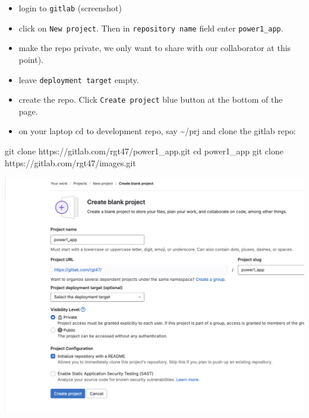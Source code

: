 \documentclass[
  letterpaper,
  DIV=11,
  numbers=noendperiod,
  oneside]{scrartcl}
\newenvironment{Shaded}{\begin{snugshade}}{\end{snugshade}}
\newcommand{\BuiltInTok}[1]{\textcolor[rgb]{0.00,0.23,0.31}{#1}}
\newcommand{\FunctionTok}[1]{\textcolor[rgb]{0.28,0.35,0.67}{#1}}
\newcommand{\NormalTok}[1]{\textcolor[rgb]{0.00,0.23,0.31}{#1}}
\begin{document}
\begin{tcolorbox}[enhanced jigsaw, title=\textcolor{quarto-callout-note-color}{\faInfo}\hspace{0.5em}{Details for creating a gitlab repo follow:}, colback=white, arc=.35mm, leftrule=.75mm, titlerule=0mm, bottomtitle=1mm, opacityback=0, opacitybacktitle=0.6, breakable, left=2mm, toptitle=1mm, bottomrule=.15mm, rightrule=.15mm, toprule=.15mm, colbacktitle=quarto-callout-note-color!10!white, coltitle=black, colframe=quarto-callout-note-color-frame]

\begin{itemize}
\item
  login to \texttt{gitlab} (screenshot)
\item
  click on \texttt{New\ project}. Then in \texttt{repository\ name}
  field enter \texttt{power1\_app}.
\item
  make the repo private, we only want to share with our collaborator at
  this point).
\item
  leave \texttt{deployment\ target} empty.
\item
  create the repo. Click \texttt{Create\ project} blue button at the
  bottom of the page.
\item
  on your laptop cd to development repo, say \textasciitilde/prj and
  clone the gitlab repo:
\end{itemize}

\begin{Shaded}
\begin{Highlighting}[]
\FunctionTok{git}\NormalTok{ clone https://gitlab.com/rgt47/power1\_app.git}
\BuiltInTok{cd}\NormalTok{ power1\_app}
\FunctionTok{git}\NormalTok{ clone https://gitlab.com/rgt47/images.git}
\end{Highlighting}
\end{Shaded}

\end{tcolorbox}

\begin{marginfigure}

{\centering \includegraphics{img/gitlab1.png}

}

\end{marginfigure}
\end{document}
